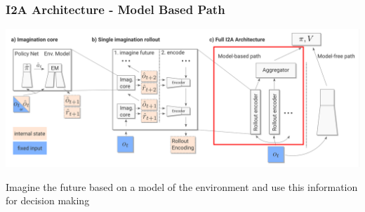 
%    


\begin{frame}
    \frametitle{I2A Architecture - Model Based Path}


\includegraphics[width=\columnwidth]{./Images/i2a_all_model_based_path.png}%

\begin{PraesentationAufzaehlung}
	\item Imagine the future based on a model of the environment and use this information for decision making
\end{PraesentationAufzaehlung}
    
\end{frame}
\clearpage

